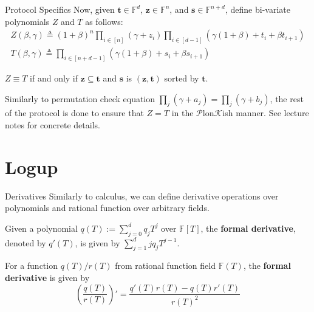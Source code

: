 \documentclass{zkdl-presentation-template}
\begin{document}
    \begin{frame}{Protocol Specifics}
        Now, given $\boldsymbol{t} \in \mathbb{F}^d$, $\boldsymbol{z} \in \mathbb{F}^n$,
        and $\boldsymbol{s} \in \mathbb{F}^{n+d}$, define bi-variate polynomials $Z$ and
        $T$ as follows:
        \begin{gather*}
            Z(\beta,\gamma) \triangleq (1+\beta)^n \prod_{i \in [n]}(\gamma+z_i)\prod_{i \in [d-1]}(\gamma(1+\beta)+t_i+\beta t_{i+1}) \\
            T(\beta,\gamma) \triangleq \prod_{i \in [n+d-1]} (\gamma(1+\beta)+s_i+\beta s_{i+1})
        \end{gather*}

        \pause\begin{proposition}
            $Z \equiv T$ if and only if $\boldsymbol{z} \subseteq \boldsymbol{t}$ and
            $\boldsymbol{s}$ is $(\boldsymbol{z},\boldsymbol{t})$ sorted by
            $\boldsymbol{t}$.\pause
        \end{proposition}

        Similarly to permutation check equation
        $\prod_{j}(\gamma+a_j)=\prod_j(\gamma+b_j)$, the rest of the protocol is
        done to ensure that $Z=T$ in the $\mathcal{P}$lon$\mathcal{K}$ish manner. See lecture notes for 
        concrete details.
    \end{frame}

    \section{Logup}

    \begin{frame}{Derivatives}
        Similarly to calculus, we can define derivative operations over polynomials 
        and rational function over arbitrary fields.\pause
        \begin{definition}
            Given a polynomial $q(T) := \sum_{j=0}^d q_jT^j$ over $\mathbb{F}[T]$, the \textbf{formal
            derivative}, denoted by $q'(T)$, is given by
            $\sum_{j=1}^{d}jq_jT^{j-1}$.\pause
        \end{definition}
        \begin{definition}
            For a function $q(T)/r(T)$ from rational function field
            $\mathbb{F}(T)$, the \textbf{formal derivative} is given by
            \begin{equation*}
                \left(\frac{q(T)}{r(T)}\right)' = \frac{q'(T)r(T) - q(T)r'(T)}{r(T)^2}
            \end{equation*}
        \end{definition}
    \end{frame}
\end{document}
